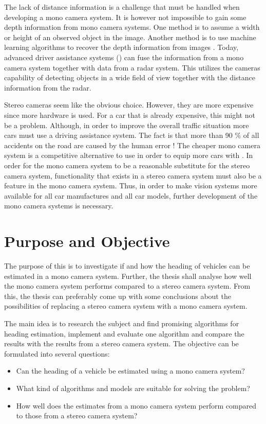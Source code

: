 The lack of distance information is a challenge that must be handled when developing a mono camera system.
It is however not impossible to gain some depth information from mono camera systems.
One method is to assume a width or height of an observed object in the image.
Another method is to use machine learning algorithms to recover the depth information from images \cite{Saxena:2008}.
Today, advanced driver assistance systems (\abbrADAS) can fuse the information from a mono camera system together with data from \eg a radar system.
This utilizes the cameras capability of detecting objects in a wide field of view together with the distance information from the radar.

Stereo cameras seem like the obvious choice.
However, they are more expensive since more hardware is used.
For a car that is already expensive, this might not be a problem.
Although, in order to improve the overall traffic situation more cars must use a driving assistance system.
The fact is that more than 90 \% of all accidents on the road are caused by the human error \cite{EuroNCAP:2017}!
The cheaper mono camera system is a competitive alternative to use in order to equip more cars with \abbrADAS.
In order for the mono camera system to be a reasonable substitute for the stereo camera system, functionality that exists in a stereo camera system must also be a feature in the mono camera system.
Thus, in order to make vision systems more available for all car manufactures and all car models, further development of the mono camera systems is necessary.

\section{Purpose and Objective}
The purpose of this \ms is to investigate if and how the heading of vehicles can be estimated in a mono camera system.
Further, the thesis shall analyse how well the mono camera system performs compared to a stereo camera system.
From this, the thesis can preferably come up with some conclusions about the possibilities of replacing a stereo camera system with a mono camera system.

The main idea is to research the subject and find promising algorithms for heading estimation, implement and evaluate one algorithm and compare the results with the results from a stereo camera system.
The objective can be formulated into several questions:

\begin{itemize}
	\item Can the heading of a vehicle be estimated using a mono camera system?

	\item What kind of algorithms and models are suitable for solving the problem?

	\item How well does the estimates from a mono camera system perform compared to those from a stereo camera system?
\end{itemize}

